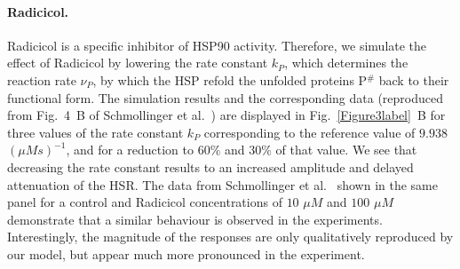 \documentclass[oneside, 10pt, a4paper, twocolumn]{article}
\begin{document}





\paragraph{Radicicol.}

Radicicol is a specific inhibitor of HSP90 activity.
Therefore, we simulate the effect of Radicicol by lowering the rate constant $k_P$,
which determines the reaction rate $\nu_P$, by which the HSP refold the unfolded proteins P$^\#$ back to their functional form. 
The simulation results and the corresponding data (reproduced from Fig.~4~B of Schmollinger et al.~\cite{Schmollinger2013}) are
displayed in Fig.~\ref{Figure3label}~B for three values of the rate constant $k_P$ corresponding to the reference value of $9.938$ $\left(\mu M s\right)^{-1}$,
and for a reduction to $60\%$ and $30\%$ of that value. 
We see that decreasing the rate constant results to an increased amplitude and delayed attenuation of the HSR.
The data from Schmollinger et al.~\cite{Schmollinger2013} shown in the same panel for a control and Radicicol concentrations of $10$ $\mu M$ and $100$ $\mu M$
demonstrate that a similar behaviour is observed in the experiments.
Interestingly, the magnitude of the responses are only qualitatively reproduced by our model, but
appear much more pronounced in the experiment. 
\end{document}
